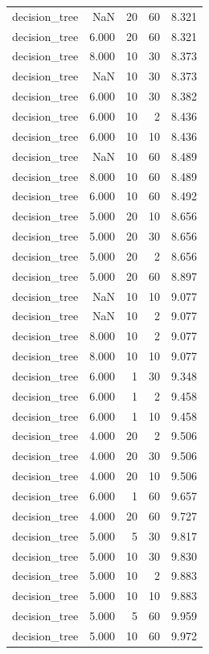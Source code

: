 \begin{tabular}{lrrrr}
decision_tree & NaN & 20 & 60 & 8.321 \\
decision_tree & 6.000 & 20 & 60 & 8.321 \\
decision_tree & 8.000 & 10 & 30 & 8.373 \\
decision_tree & NaN & 10 & 30 & 8.373 \\
decision_tree & 6.000 & 10 & 30 & 8.382 \\
decision_tree & 6.000 & 10 & 2 & 8.436 \\
decision_tree & 6.000 & 10 & 10 & 8.436 \\
decision_tree & NaN & 10 & 60 & 8.489 \\
decision_tree & 8.000 & 10 & 60 & 8.489 \\
decision_tree & 6.000 & 10 & 60 & 8.492 \\
decision_tree & 5.000 & 20 & 10 & 8.656 \\
decision_tree & 5.000 & 20 & 30 & 8.656 \\
decision_tree & 5.000 & 20 & 2 & 8.656 \\
decision_tree & 5.000 & 20 & 60 & 8.897 \\
decision_tree & NaN & 10 & 10 & 9.077 \\
decision_tree & NaN & 10 & 2 & 9.077 \\
decision_tree & 8.000 & 10 & 2 & 9.077 \\
decision_tree & 8.000 & 10 & 10 & 9.077 \\
decision_tree & 6.000 & 1 & 30 & 9.348 \\
decision_tree & 6.000 & 1 & 2 & 9.458 \\
decision_tree & 6.000 & 1 & 10 & 9.458 \\
decision_tree & 4.000 & 20 & 2 & 9.506 \\
decision_tree & 4.000 & 20 & 30 & 9.506 \\
decision_tree & 4.000 & 20 & 10 & 9.506 \\
decision_tree & 6.000 & 1 & 60 & 9.657 \\
decision_tree & 4.000 & 20 & 60 & 9.727 \\
decision_tree & 5.000 & 5 & 30 & 9.817 \\
decision_tree & 5.000 & 10 & 30 & 9.830 \\
decision_tree & 5.000 & 10 & 2 & 9.883 \\
decision_tree & 5.000 & 10 & 10 & 9.883 \\
decision_tree & 5.000 & 5 & 60 & 9.959 \\
decision_tree & 5.000 & 10 & 60 & 9.972 \\

\end{tabular}
